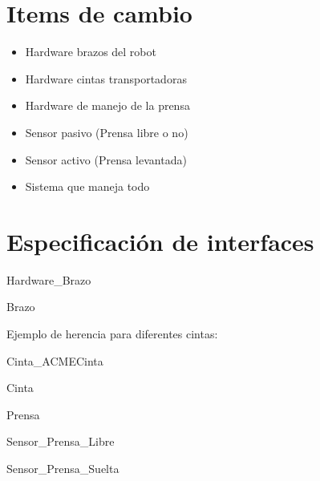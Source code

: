 \documentclass[12pt,a4paper,fleqn]{article}
\begin{document}
\section{Items de cambio}

\begin{itemize}
  \item Hardware brazos del robot
  \item Hardware cintas transportadoras
  \item Hardware de manejo de la prensa
  \item Sensor pasivo (Prensa libre o no)
  \item Sensor activo (Prensa levantada)
  \item Sistema que maneja todo
\end{itemize}

\section{Especificación de interfaces}

\begin{module}{Hardware\_Brazo}
\eproc
{}
\end{module}

\begin{module}{Brazo}
\eproc
{}
\end{module}

Ejemplo de herencia para diferentes cintas:

\begin{hmodule}{Cinta\_ACME}{Cinta}
\end{hmodule}

\begin{module}{Cinta}
\eproc
{}
\end{module}

\begin{module}{Prensa}
\eproc
{}
\end{module}

\begin{module}{Sensor\_Prensa\_Libre}
\eproc
{}
\end{module}

\begin{module}{Sensor\_Prensa\_Suelta}
\eproc
{}
\end{module}
\end{document}

